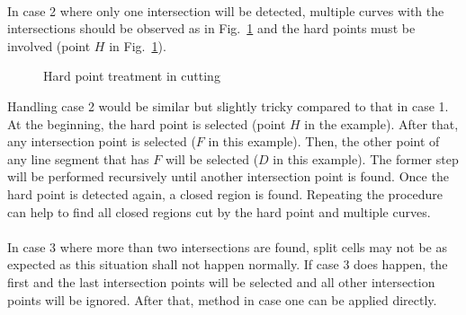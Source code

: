 \paragraph{}
In case 2 where only one intersection will be detected, multiple curves with the intersections should be observed as in Fig.~\ref{qdt_fig:qdt_cutting_hard_point} and the hard points must be involved (point $H$ in Fig.~\ref{qdt_fig:qdt_cutting_hard_point}).
    \begin{figure}
        \centering
        \caption[Hard point treatment in cutting]{Hard point treatment in cutting}
        \label{qdt_fig:qdt_cutting_hard_point}
    \end{figure}
Handling case 2 would be similar but slightly tricky compared to that in case 1.
At the beginning, the hard point is selected (point $H$ in the example).
After that, any intersection point is selected ($F$ in this example).
Then, the other point of any line segment that has $F$ will be selected ($D$ in this example).
The former step will be performed recursively until another intersection point is found.
Once the hard point is detected again, a closed region is found.
Repeating the procedure can help to find all closed regions cut by the hard point and multiple curves.

\paragraph{}
In case 3 where more than two intersections are found, split cells may not be as expected as this situation shall not happen normally.
If case 3 does happen, the first and the last intersection points will be selected and all other intersection points will be ignored.
After that, method in case one can be applied directly.



